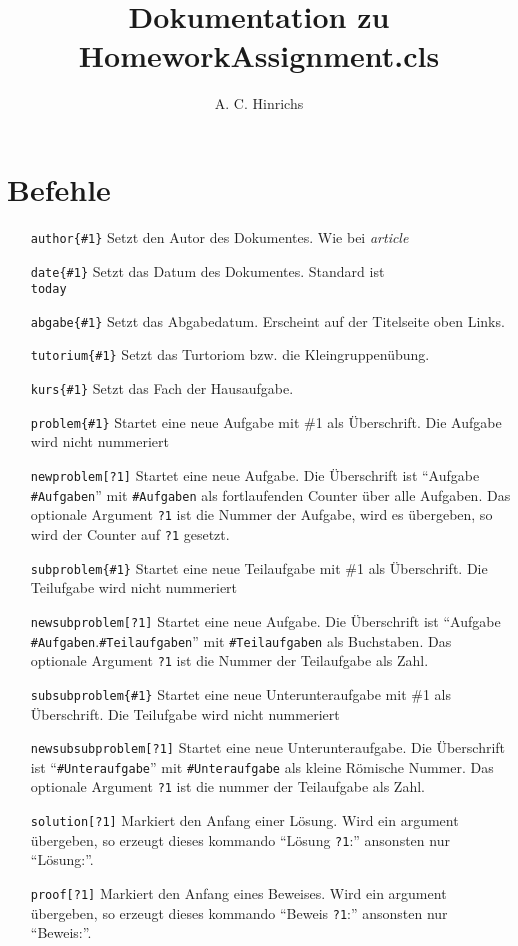 \documentclass[a4papr]{article}
\title{Dokumentation zu HomeworkAssignment.cls}
\author{A. C. Hinrichs}
\begin{document}
\maketitle
\section{Befehle}
\begin{itemize}
\item[\texttt{author\{\#1\}}] Setzt den Autor des Dokumentes. Wie bei
  \textit{article}
\item[\texttt{date\{\#1\}}] Setzt das Datum des Dokumentes. Standard
  ist \texttt{\\today}
\item[\texttt{abgabe\{\#1\}}] Setzt das Abgabedatum. Erscheint auf der
  Titelseite oben Links.
\item[\texttt{tutorium\{\#1\}}] Setzt das Turtoriom bzw. die
  Kleingruppen\"ubung.
\item[\texttt{kurs\{\#1\}}] Setzt das Fach der Hausaufgabe.
\item[\texttt{problem\{\#1\}}] Startet eine neue Aufgabe mit \#1 als
  \"Uberschrift.  Die Aufgabe wird nicht nummeriert
\item[\texttt{newproblem[?1]}] Startet eine neue Aufgabe. Die
  \"Uberschrift ist \enquote{Aufgabe \texttt{\#Aufgaben}} mit
  \texttt{\#Aufgaben} als fortlaufenden Counter \"uber alle Aufgaben.
  Das optionale Argument \texttt{?1} ist die Nummer der Aufgabe, wird
  es \"ubergeben, so wird der Counter auf \texttt{?1} gesetzt.
\item[\texttt{subproblem\{\#1\}}] Startet eine neue Teilaufgabe mit
  \#1 als \"Uberschrift.  Die Teilufgabe wird nicht nummeriert
\item[\texttt{newsubproblem[?1]}] Startet eine neue Aufgabe. Die
  \"Uberschrift ist \enquote{Aufgabe
    \texttt{\#Aufgaben}.\texttt{\#Teilaufgaben}} mit
  \texttt{\#Teilaufgaben} als Buchstaben.  Das optionale Argument
  \texttt{?1} ist die Nummer der Teilaufgabe als Zahl.
\item[\texttt{subsubproblem\{\#1\}}] Startet eine neue
  Unterunteraufgabe mit \#1 als \"Uberschrift.  Die Teilufgabe wird
  nicht nummeriert
\item[\texttt{newsubsubproblem[?1]}] Startet eine neue
  Unterunteraufgabe. Die \"Uberschrift ist
  \enquote{\texttt{\#Unteraufgabe}} mit \texttt{\#Unteraufgabe} als
  kleine R\"omische Nummer.  Das optionale Argument \texttt{?1} ist
  die nummer der Teilaufgabe als Zahl.
\item[\texttt{solution[?1]}] Markiert den Anfang einer L\"osung.
  Wird ein argument \"ubergeben, so erzeugt dieses kommando
  \enquote{L\"osung \texttt{?1}:} ansonsten nur \enquote{L\"osung:}.
\item[\texttt{proof[?1]}] Markiert den Anfang eines Beweises.  Wird
  ein argument \"ubergeben, so erzeugt dieses kommando \enquote{Beweis
    \texttt{?1}:} ansonsten nur \enquote{Beweis:}.
\end{itemize}
\end{document}
